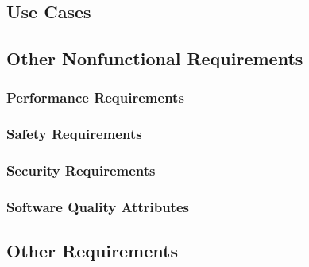 \pagebreak

\subsection{ Use Cases}

\pagebreak

\subsection{ Other Nonfunctional Requirements}
\subsubsection{Performance Requirements}
\subsubsection{ Safety Requirements}
\subsubsection{ Security Requirements}
\subsubsection{ Software Quality Attributes}

\subsection{ Other Requirements}